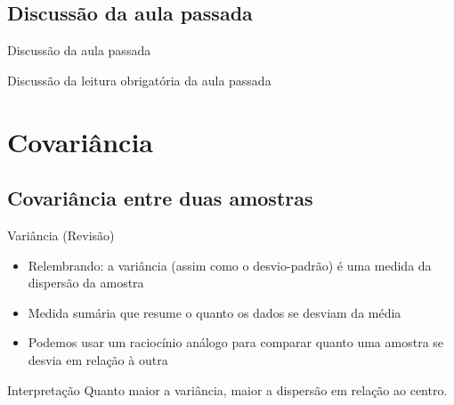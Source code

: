 \documentclass{beamer}
\begin{document}
\subsection{Discussão da aula passada}

\begin{frame}{Discussão da aula passada}
  \begin{block}{}
    Discussão da leitura obrigatória da aula passada
  \end{block}
\end{frame}

\section{Covariância}

\subsection[Covariância]{Covariância entre duas amostras}

\begin{frame}{Variância (Revisão)}
  \begin{itemize}
  \item Relembrando: a variância (assim como o desvio-padrão) é uma
    medida da dispersão da amostra
  \item Medida sumária que resume o quanto os dados se desviam da
    média
  \item Podemos usar um raciocínio análogo para comparar quanto uma
    amostra se desvia em relação à outra
  \end{itemize}
  \begin{block}{Interpretação}
    Quanto maior a variância, maior a dispersão em relação ao centro.
  \end{block}
\end{frame}
\end{document}
